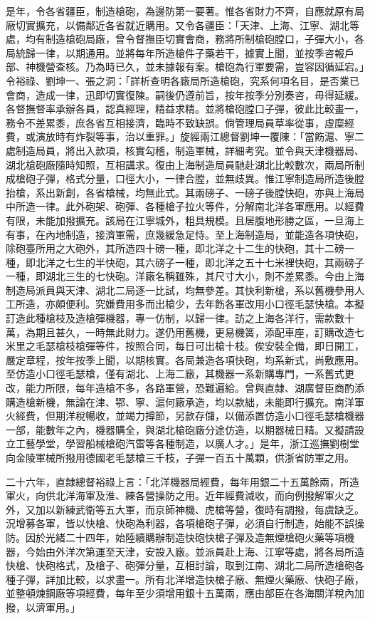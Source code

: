 \begin{pinyinscope}
是年，令各省疆臣，制造槍砲，為邊防第一要著。惟各省財力不齊，自應就原有局廠切實擴充，以備鄰近各省就近購用。又令各疆臣：「天津、上海、江寧、湖北等處，均有制造槍砲局廠，曾令督撫臣切實會商，務將所制槍砲膛口，子彈大小，各局統歸一律，以期通用。並將每年所造槍件子藥若干，據實上聞，並按季咨報戶部、神機營查核。乃為時已久，並未據報有案。槍砲為行軍要需，豈容因循延宕。」令裕祿、劉坤一、張之洞：「詳析查明各廠局所造槍砲，究系何項名目，是否業已會商，造成一律，迅即切實復陳。嗣後仍遵前旨，按年按季分別奏咨，毋得延緩。各督撫督率承辦各員，認真經理，精益求精。並將槍砲膛口子彈，彼此比較畫一，務令不差累黍，庶各省互相接濟，臨時不致缺誤。倘管理局員草率從事，虛糜經費，或演放時有炸裂等事，治以重罪。」旋經兩江總督劉坤一覆陳：「當飭滬、寧二處制造局員，將出入款項，核實勾稽，制造軍械，詳細考究。並令與天津機器局、湖北槍砲廠隨時知照，互相講求。復由上海制造局員馳赴湖北比較數次，兩局所制成槍砲子彈，格式分量，口徑大小，一律合膛，並無歧異。惟江寧制造局所造後膛抬槍，系出新創，各省槍械，均無此式。其兩磅子、一磅子後膛快砲，亦與上海局中所造一律。此外砲架、砲彈、各種槍子拉火等件，分解南北洋各軍應用。以經費有限，未能加撥擴充。該局在江寧城外，粗具規模。且居腹地形勝之區，一旦海上有事，在內地制造，接濟軍需，庶幾緩急足恃。至上海制造局，並能造各項快砲，除砲臺所用之大砲外，其所造四十磅一種，即北洋之十二生的快砲，其十二磅一種，即北洋之七生的半快砲，其六磅子一種，即北洋之五十七米裡快砲，其兩磅子一種，即湖北三生的七快砲。洋廠名稱雖殊，其尺寸大小，則不差累黍。今由上海制造局派員與天津、湖北二局逐一比試，均無參差。其快利新槍，系以舊機參用人工所造，亦頗便利。究嫌費用多而出槍少，去年飭各軍改用小口徑毛瑟快槍。本擬訂造此種槍枝及造槍彈機器，專一仿制，以歸一律。訪之上海各洋行，需款數十萬，為期且甚久，一時無此財力。遂仍用舊機，更易機簧，添配車座，訂購改造七米里之毛瑟槍枝槍彈等件，按照合同，每日可出槍十枝。俟安裝全備，即日開工，嚴定章程，按年按季上聞，以期核實。各局兼造各項快砲，均系新式，尚敷應用。至仿造小口徑毛瑟槍，僅有湖北、上海二廠，其機器一系新購專門，一系舊式更改，能力所限，每年造槍不多，各路軍營，恐難遍給。曾與直隸、湖廣督臣商酌添購造槍新機，無論在津、鄂、寧、滬何廠承造，均以款絀，未能即行擴充。南洋軍火經費，但期洋稅暢收，並竭力撙節，另款存儲，以備添置仿造小口徑毛瑟槍機器一部，能數年之內，機器購全，與湖北槍砲廠分途仿造，以期器械日精。又擬請設立工藝學堂，學習船械槍砲汽雷等各種制造，以廣人才。」是年，浙江巡撫劉樹堂向金陵軍械所撥用德國老毛瑟槍三千枝，子彈一百五十萬顆，供浙省防軍之用。

二十六年，直隸總督裕祿上言：「北洋機器局經費，每年用銀二十五萬餘兩，所造軍火，向供北洋海軍及淮、練各營操防之用。近年經費減收，而向例撥解軍火之外，又加以新練武衛等五大軍，而京師神機、虎槍等營，復時有調撥，每虞缺乏。況增募各軍，皆以快槍、快砲為利器，各項槍砲子彈，必須自行制造，始能不誤操防。因於光緒二十四年，始陸續購辦制造快砲快槍子彈及造無煙槍砲火藥等項機器，今始由外洋次第運至天津，安設入廠。並派員赴上海、江寧等處，將各局所造快槍、快砲格式，及槍子、砲彈分量，互相討論，取到江南、湖北二局所造槍砲各種子彈，詳加比較，以求畫一。所有北洋增造快槍子廠、無煙火藥廠、快砲子廠，並整頓煉鋼廠等項經費，每年至少須增用銀十五萬兩，應由部臣在各海關洋稅內加撥，以濟軍用。」


\end{pinyinscope}
